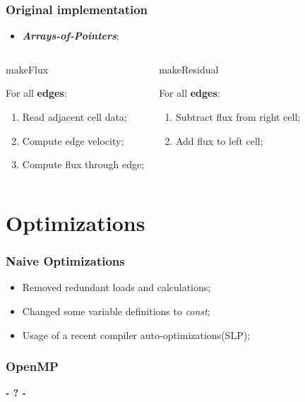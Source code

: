 \documentclass{beamer}
\begin{document}
\begin{frame}
	\frametitle{Original implementation}
	\begin{itemize}
		\item \textbf{\itshape Arrays-of-Pointers};				
	\end{itemize}

	\begin{columns}
		\begin{block}{makeFlux}
			
			For all \textbf{edges}:
			\begin{enumerate}
				\item Read adjacent cell data;	
				\item Compute edge velocity;
				\item Compute flux through edge;				
			\end{enumerate}
		\end{block}

		\begin{block}{makeResidual}
			
			For all \textbf{edges}:
			\begin{enumerate}
				\item Subtract flux from right cell;
				\item Add flux to left cell;
			\end{enumerate}
		\end{block}
	\end{columns}
\end{frame}

\section{Optimizations}

\begin{frame}
	\frametitle{Naive Optimizations}	
		\begin{itemize}
		\item Removed redundant loads and calculations;
		\item Changed some variable definitions to \emph{const};
		\item Usage of a recent compiler auto-optimizations(SLP);				
	\end{itemize} 	
\end{frame}

\begin{frame}
	\frametitle{OpenMP}
\end{frame}

\begin{frame}
\titlepage
	\begin{center}
		\Huge\bfseries
		- ? -
	\end{center}
\end{frame}
\end{document}
